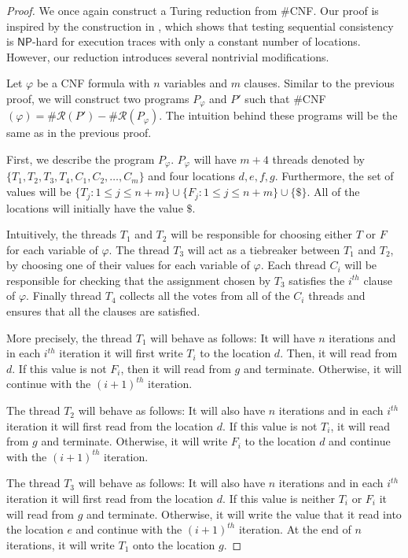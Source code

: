 \begin{proof}
    We once again construct a Turing reduction from $\#$CNF. Our proof is inspired by the construction in 
    \cite{sharedMem}, which shows that testing sequential consistency is $\mathsf{NP}$-hard for execution traces with only a constant number of locations. However, our reduction introduces several nontrivial modifications.

    Let $\varphi$ be a CNF formula with $n$ variables
    and $m$ clauses. Similar to the previous proof, we will construct
    two programs $P_\varphi$ and $P'$ such that  $\#$CNF$(\varphi) = \#\mathcal{R}(P') - \#\mathcal{R}(P_\varphi)$. The intuition behind these programs will
    be the same as in the previous proof.

    First, we describe the program $P_\varphi$. $P_\varphi$ will have $m+4$ threads
    denoted by $\{T_1,T_2,T_3,T_4,C_1,C_2,\dots,C_m\}$ and four locations $d,e,f,g$. 
    Furthermore, the set of values will be $\{T_j : 1 \le j \le n+m\} \cup \{F_j : 1 \le j \le n+m\} \cup  \{\$\}$. All of the locations will initially have the value $\$$.
    
    Intuitively, the threads $T_1$ and $T_2$ will be responsible for choosing either $T$ or $F$ for each variable of $\varphi$. The thread $T_3$ will act as a tiebreaker between $T_1$ 
    and $T_2$, by choosing one of their values for each variable of $\varphi$.
    Each thread $C_i$ will be responsible for checking that the assignment
    chosen by $T_3$ satisfies the $i^{th}$ clause of $\varphi$.
    Finally thread $T_4$ collects all the votes from all of the $C_i$ threads and 
    ensures that all the clauses are satisfied.

    More precisely, the thread $T_1$ will behave as follows: It will have $n$ iterations
    and in each $i^{th}$ iteration it will first write $T_i$ to the location $d$. Then, it will read from $d$.
    If this value is not $F_i$, then it will read from $g$ and terminate.
    Otherwise, it will continue with the $(i+1)^{th}$ iteration.

    The thread $T_2$ will behave as follows: It will also have $n$ iterations
    and in each $i^{th}$ iteration it will first read from the location $d$.
    If this value is not $T_i$, it will read from $g$ and terminate.
    Otherwise, it will write $F_i$ to the location $d$ and continue with the $(i+1)^{th}$ iteration.

    The thread $T_3$ will behave as follows: It will also have $n$ iterations
    and in each $i^{th}$ iteration it will first read from the location $d$.
    If this value is neither $T_i$ or $F_i$ it will read from $g$ and terminate.
    Otherwise, it will write the value that it read into the location $e$
    and continue with the $(i+1)^{th}$ iteration.
    At the end of $n$ iterations, it will write $T_1$ onto the location $g$.


\end{proof}
